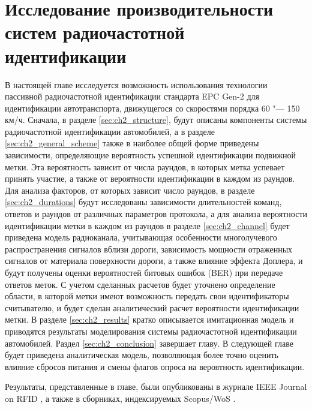 \chapter{Исследование производительности систем радиочастотной идентификации}\label{ch:ch2}

В настоящей главе исследуется возможность использования технологии пассивной радиочастотной идентификации стандарта EPC Gen-2 \cite{StdGen2} для идентификации автотранспорта, движущегося со скоростями порядка 60 "--- 150 км/ч. Сначала, в разделе \ref{sec:ch2_structure}, будут описаны компоненты системы радиочастотной идентификации автомобилей, а в разделе \ref{sec:ch2_general_scheme} также в наиболее общей форме приведены зависимости, определяющие вероятность успешной идентификации подвижной метки. Эта вероятность зависит от числа раундов, в которых метка успевает принять участие, а также от вероятности идентификации в каждом из раундов. Для анализа факторов, от которых зависит число раундов, в разделе \ref{sec:ch2_durations} будут исследованы зависимости длительностей команд, ответов и раундов от различных параметров протокола, а для анализа вероятности идентификации метки в каждом из раундов в разделе \ref{sec:ch2_channel} будет приведена модель радиоканала, учитывающая особенности многолучевого распространения сигналов вблизи дороги, зависимость мощности отраженных сигналов от материала поверхности дороги, а также влияние эффекта Доплера, и будут получены оценки вероятностей битовых ошибок (BER) при передаче ответов меток. С учетом сделанных расчетов будет уточнено определение области, в которой метки имеют возможность передать свои идентификаторы считывателю, и будет сделан аналитический расчет вероятности идентификации метки. В разделе \ref{sec:ch2_results} кратко описывается имитационная модель и приводятся результаты моделирования системы радиочастотной идентификации автомобилей. Раздел \ref{sec:ch2_conclusion} завершает главу. В следующей главе будет приведена аналитическая модель, позволяющая более точно оценить влияние сбросов питания и смены флагов опроса на вероятность идентификации.

Результаты, представленные в главе, были опубликованы в журнале IEEE Journal on RFID \cite{RFID_JRFID2017}, а также в сборниках, индексируемых Scopus/WoS \cite{RFID_IEEERFID2017,RFID_DCCN2016_CCIS,RFID_SYNCHROINFO2018}.




